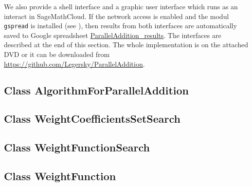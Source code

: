 We also provide a shell interface and a graphic user interface which runs as an interact in SageMathCloud. If the network access is enabled and the modul \verb+gspread+ is installed (see \cite{gspread}), then results from both interfaces are automatically saved to Google spreadsheet \href{https://docs.google.com/spreadsheets/d/1TnhrHdefHfHa0WSeVs4q6XVj3epjPlPlnoekE0E1xeM/edit?usp=sharing}{ParallelAddition\_results}. The interfaces are described at the end of this section. The whole implementation is on the attached DVD or it can be downloaded from  \url{https://github.com/Legersky/ParallelAddition}.



\subsection*{Class AlgorithmForParallelAddition}



\subsection*{Class WeightCoefficientsSetSearch}



\subsection*{Class WeightFunctionSearch}



\subsection*{Class WeightFunction}


